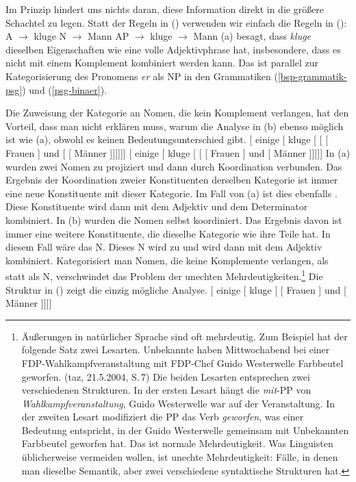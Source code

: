 Im Prinzip hindert uns nichts daran, diese Information direkt in die größere Schachtel zu legen. Statt
der Regeln in () verwenden wir einfach die Regeln in ():
\eal
\ex A $\to$ kluge
\ex N $\to$ Mann
\zl
\eal
\label{Lexikon-Projektion}
\ex AP $\to$ kluge
\ex \nbar $\to$ Mann
\zl
(a) besagt, dass \emph{kluge} dieselben Eigenschaften wie eine volle Adjektivphrase hat, insbesondere, dass es nicht
mit einem Komplement kombiniert werden kann. Das ist parallel zur Kategorisierung des Pronomens \emph{er} als NP in den Grammatiken
(\ref{bsp-grammatik-psg}) und (\ref{psg-binaer}).

Die Zuweisung der Kategorie \nbar an Nomen, die kein Komplement verlangen, hat den Vorteil, dass man nicht erklären muss, warum die Analyse in (b) ebenso möglich ist wie
(a), obwohl es keinen Bedeutungsunterschied gibt.
\eal
\ex
{}[ einige [\sub{\nbar} kluge [\sub{\nbar} [\sub{\nbar} [ Frauen ] und  [\sub{\nbar} [ Männer ]]]]]]
\ex
{}[ einige [\sub{\nbar} kluge [\sub{\nbar} [ [ Frauen ] und [ Männer
]]]]]
\zl
%
In (a) wurden zwei Nomen zu \nbar projiziert und dann durch Koordination verbunden. Das Ergebnis der Koordination
zweier Konstituenten derselben Kategorie ist immer eine neue Konstituente mit dieser Kategorie. Im Fall von (a) ist dies
ebenfalls \nbar. Diese Konstituente wird dann mit dem Adjektiv und dem Determinator kombiniert. In (b) wurden die Nomen selbst
koordiniert. Das Ergebnis davon ist immer eine weitere Konstituente, die dieselbe Kategorie wie ihre Teile hat. In diesem Fall
wäre das N. Dieses N wird zu \nbar und wird dann mit dem Adjektiv kombiniert. Kategorisiert man Nomen, die keine Komplemente verlangen,
als \nbar statt als N, verschwindet das Problem der unechten Mehrdeutigkeiten.\footnote{
Äußerungen in natürlicher Sprache sind oft mehrdeutig. Zum Beispiel hat der folgende Satz zwei
Lesarten.
\ea
Unbekannte haben Mittwochabend bei einer FDP-Wahlkampfveranstaltung mit FDP-Chef Guido Westerwelle Farbbeutel geworfen. (taz, 21.5.2004, S.\,7)
\z
Die beiden Lesarten entsprechen zwei verschiedenen Strukturen. In der ersten Lesart hängt die \emph{mit}-PP
von \emph{Wahlkampfveranstaltung}, \dash Guido Westerwelle war auf der Veranstaltung. In der zweiten
Lesart modifiziert die PP das Verb \emph{geworfen}, was einer Bedeutung entspricht, in der Guido
Westerwelle gemeinsam mit Unbekannten Farbbeutel geworfen hat. Das ist normale Mehrdeutigkeit. Was Linguisten
üblicherweise vermeiden wollen, ist unechte Mehrdeutigkeit: Fälle, in denen man dieselbe Semantik, aber zwei
verschiedene syntaktische Strukturen hat.
}
Die Struktur in () zeigt die einzig mögliche Analyse.
\ea
{}[ einige [\sub{\nbar} kluge [\sub{\nbar} [\sub{\nbar} Frauen ] und [\sub{\nbar} Männer
]]]]
\z

